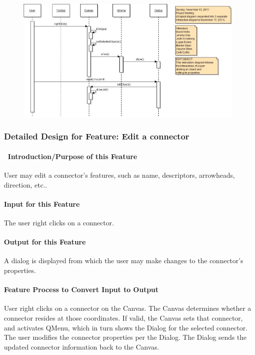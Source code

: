 \documentclass[twoside,letterpaper]{article}
\begin{document}
{\begin{figure}[h]
\centering
\includegraphics[width=6.0in]{IntEditObj.jpg}
\end{figure}

\clearpage


\subsubsection{Detailed Design for Feature: Edit a connector}

\paragraph[\ Introduction/Purpose of this Feature]
{\ Introduction/Purpose of this Feature}
{\color{black}
User may edit a connector{\textquoteright}s features, such as name, descriptors, arrowheads, direction, etc..
}

\paragraph[Input for this Feature]{Input for this Feature}
{\color{black}
The user right clicks on a connector.
}

\paragraph{Output for this Feature}
{\color{black}
A dialog is displayed from which the user may make changes to the connector{\textquoteright}s properties.
}

\paragraph{Feature Process to Convert Input to Output}
{\color{black}
User right clicks on a connector on the Canvas. The Canvas determines whether a connector resides at those coordinates. If valid, the Canvas sets that connector, and activates QMenu, which in turn shows the Dialog for the selected connector.
The user modifies the connector properties per the Dialog.  The Dialog sends the updated connector information back to the Canvas.
}

}
\end{document}
